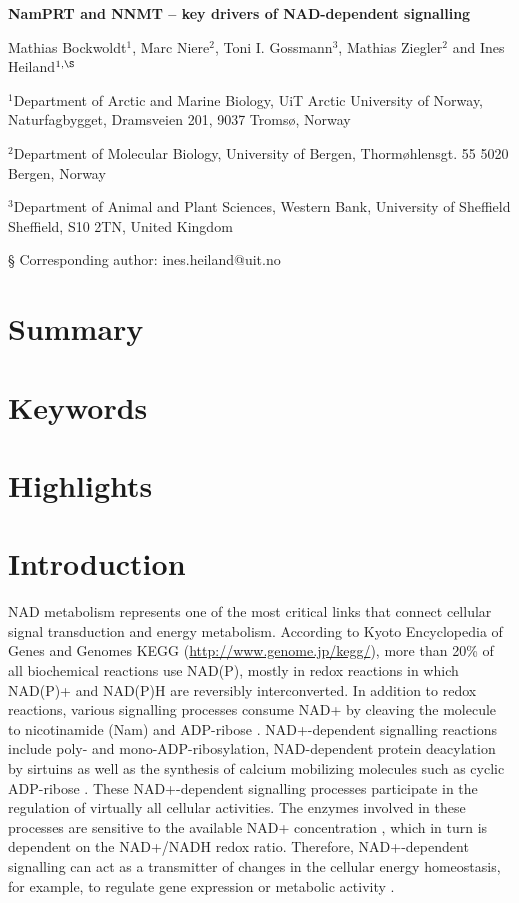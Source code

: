 \documentclass[paper=a4, 12pt]{scrartcl}
\begin{document}
\noindent
{\huge\sffamily\bfseries NamPRT and NNMT – key drivers of NAD-dependent signalling \par}

\vspace{2cm}

\noindent
Mathias Bockwoldt$^{1}$, Marc Niere$^{2}$, Toni I. Gossmann$^{3}$, Mathias Ziegler$^{2}$ and Ines Heiland$^{1,\S}$

\vspace{1cm}

\noindent
$^{1}$Department of Arctic and Marine Biology, UiT Arctic University of Norway, Naturfagbygget, Dramsveien 201, 9037 Tromsø, Norway

\noindent
$^{2}$Department of Molecular Biology, University of Bergen, Thormøhlensgt. 55
5020 Bergen, Norway

\noindent
$^{3}$Department of Animal and Plant Sciences, Western Bank, University of Sheffield
Sheffield, S10 2TN, United Kingdom

\noindent
§ Corresponding author: ines.heiland@uit.no


\section{Summary}


\section{Keywords}


\section{Highlights}


\section{Introduction}

NAD metabolism represents one of the most critical links that connect cellular signal transduction and energy metabolism. According to Kyoto Encyclopedia of Genes and Genomes KEGG (\url{http://www.genome.jp/kegg/}), more than 20\% of all biochemical reactions use NAD(P), mostly in redox reactions in which NAD(P)+ and NAD(P)H are reversibly interconverted. In addition to redox reactions, various signalling processes consume NAD+ by cleaving the molecule to nicotinamide (Nam) and ADP-ribose \cite{Verdin2015}. NAD+-dependent signalling reactions include poly- and mono-ADP-ribosylation, NAD-dependent protein deacylation by sirtuins as well as the synthesis of calcium mobilizing molecules such as cyclic ADP-ribose \cite{Opitz2015}. These NAD+-dependent signalling processes participate in the regulation of virtually all cellular activities. The enzymes involved in these processes are sensitive to the available NAD+ concentration \cite{Ruggieri2015}, which in turn is dependent on the NAD+/NADH redox ratio. Therefore, NAD+-dependent signalling can act as a transmitter of changes in the cellular energy homeostasis, for example, to regulate gene expression or metabolic activity \cite{Koch-Nolte2009}.
\end{document}
